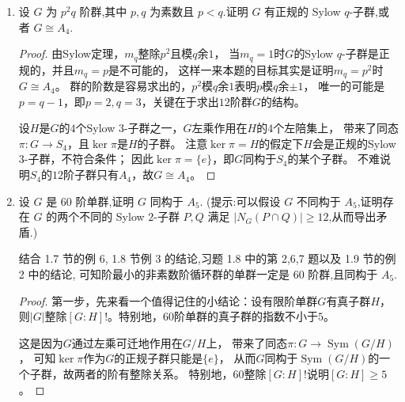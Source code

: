 \begin{enumerate}
\begin{proof}
    对任意固定的$g\in\varLambda$，设$LgH$是$H$的多个左陪集$gH,\ell gH,\ell'gH,\cdots$的无交并，即
    \[\textstyle LgH=gH\coprod\ell gH\coprod\ell'gH\coprod\cdots.\]
    考察$L$在集合$O=\{gH,\ell gH,\ell'gH,\cdots\}$上可迁的左乘作用，$gH$的稳定子群为
    \[\operatorname{Stab}(gH)=\{a \in L \mid agH=gH\}=gHg^{-1} \cap L,\]
    注意$H$是$p$-群意味着$gHg^{-1} \cap L$也是$p$-群。对轨道$O$的长度进行算两次，可知
    \[\frac{|LgH|}{|H|}=[L:\operatorname{Stab}(gH)]=\frac{|L|}{|gHg^{-1} \cap L|},\]
    接着对$g\in\varLambda$求和，得出
    \[\frac{|G|}{|H|}=\sum_{g\in\varLambda}\frac{|L|}{|gHg^{-1} \cap L|},\]
    上式左边不整除$p$，则右边有项不整除$p$，
    即存在$g\in\varLambda$使得$|gHg^{-1} \cap L|$穷尽了$|L|$中$p$的幂次，
    从而$gHg^{-1} \cap L$是$L$的Sylow $p$-子群。
\end{proof}
\item 设 $G$ 为 $p^2 q$ 阶群,其中 $p,q$ 为素数且 $p<q$.证明 $G$ 有正规的 Sylow $q$-子群,或者 $G \cong A_4$.
\begin{proof}
    由Sylow定理，$m_q$整除$p^2$且模$q$余$1$，
    当$m_q=1$时$G$的Sylow $q$-子群是正规的，并且$m_q=p$是不可能的，
    这样一来本题的目标其实是证明$m_q=p^2$时$G \cong A_4$。
    群的阶数是容易求出的，$p^2$模$q$余$1$表明$p$模$q$余$\pm1$，
    唯一的可能是$p=q-1$，即$p=2,q=3$，关键在于求出$12$阶群$G$的结构。

    设$H$是$G$的$4$个Sylow $3$-子群之一，$G$左乘作用在$H$的$4$个左陪集上，
    带来了同态$\pi:G \to S_4$，且$\ker\pi$是$H$的子群。
    注意$\ker\pi=H$的假定下$H$会是正规的Sylow $3$-子群，不符合条件；
    因此$\ker\pi=\{e\}$，即$G$同构于$S_4$的某个子群。
    不难说明$S_4$的$12$阶子群只有$A_4$，故$G \cong A_4$。
\end{proof}
\item 设 $G$ 是 $60$ 阶单群,证明 $G$ 同构于 $A_5$. (提示:可以假设 $G$ 不同构于 $A_5$,证明存在 $G$ 的两个不同的 Sylow $2$-子群 $P,Q$ 满足 $|N_{G} (P \cap Q)| \geqslant 12$,从而导出矛盾.)

结合 1.7 节的例 6, 1.8 节例 3 的结论,习题 1.8 中的第 2,6,7 题以及 1.9 节的例 2 中的结论,
可知阶最小的非素数阶循环群的单群一定是 $60$ 阶群,且同构于 $A_5$.
\begin{proof}
    第一步，先来看一个值得记住的小结论：设有限阶单群$G$有真子群$H$，
    则$|G|$整除$[G:H]!$。特别地，$60$阶单群的真子群的指数不小于$5$。

    这是因为$G$通过左乘可迁地作用在$G/H$上，
    带来了同态$\pi:G\to\operatorname{Sym}(G/H)$，
    可知$\ker\pi$作为$G$的正规子群只能是$\{e\}$，
    从而$G$同构于$\operatorname{Sym}(G/H)$的一个子群，故两者的阶有整除关系。
    特别地，$60$整除$[G:H]!$说明$[G:H]\geqslant5$。


\end{proof}
\end{enumerate}
